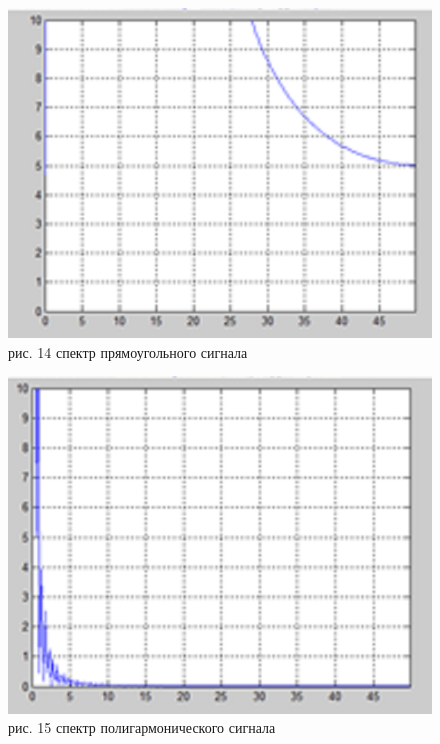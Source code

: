 \documentclass[10pt,a4paper]{report}
\begin{document}
\begin{figure}
\begin{center}
\includegraphics[angle=0, scale = 0.7]{14.png}\newline
рис. 14   спектр прямоугольного сигнала\newline
\end{center}
\end{figure}

\begin{figure}
\begin{center}
\includegraphics[angle=0, scale = 0.7]{15.png}\newline
рис. 15    спектр полигармонического сигнала\newline
\end{center}
\end{figure}
\end{document}
